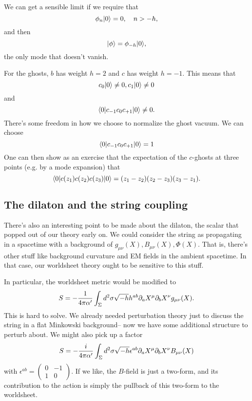 We can get a sensible limit if we require that
\begin{equation}
    \phi_n \lvert0\rangle =0,\quad n > -h,
\end{equation}
and then
\begin{equation}
    \lvert\phi\rangle=\phi_{-h} \lvert0\rangle,
\end{equation}
the only mode that doesn't vanish.

For the ghosts, $b$ has weight $h=2$ and $c$ has weight $h=-1$. This means that
\begin{equation}
    c_0\lvert0\rangle \neq 0, c_1 \lvert0\rangle \neq 0
\end{equation}
and
\begin{equation}
    \langle0\rvert c_{-1} c_0 c_{+1}\lvert0\rangle \neq 0.
\end{equation}
There's some freedom in how we choose to normalize the ghost vacuum.
We can choose
\begin{equation}
    \langle0\rvert c_{-1} c_0 c_{+1} \lvert0\rangle =1
\end{equation}
%
One can then show as an exercise that the expectation of the $c$-ghosts at three points (e.g. by a mode expansion) that
\begin{equation}
    \langle0\rvert c(z_1) c(z_2) c(z_3) \lvert0\rangle = (z_1-z_2)(z_2-z_3)(z_3-z_1).
\end{equation}
\subsection*{The dilaton and the string coupling}
There's also an interesting point to be made about the dilaton, the scalar that popped out of our theory early on. We could consider the string as propagating in a spacetime with a background of $g_{\mu\nu}(X),B_{\mu\nu}(X),\Phi(X)$. That is, there's other stuff like background curvature and EM fields in the ambient spacetime. In that case, our worldsheet theory ought to be sensitive to this stuff.

In particular, the worldsheet metric would be modified to
\begin{equation}
    S=-\frac{1}{4\pi \alpha'} \int_\Sigma d^2\sigma \sqrt{-h} h^{ab} \partial_a X^\mu \partial_b X^\nu g_{\mu\nu}(X).
\end{equation}
This is hard to solve. We already needed perturbation theory just to discuss the string in a flat Minkowski background-- now we have some additional structure to perturb about. We might also pick up a factor
\begin{equation}
    S=-\frac{i}{4\pi \alpha'} \int_\Sigma d^2\sigma \sqrt{-h} \epsilon^{ab} \partial_a X^\mu \partial_b X^\nu B_{\mu\nu}(X)
\end{equation}
with $\epsilon^{ab}=\begin{pmatrix} 0 & -1\\ 1& 0\end{pmatrix}.$ If we like, the $B$-field is just a two-form, and its contribution to the action is simply the pullback of this two-form to the worldsheet.

